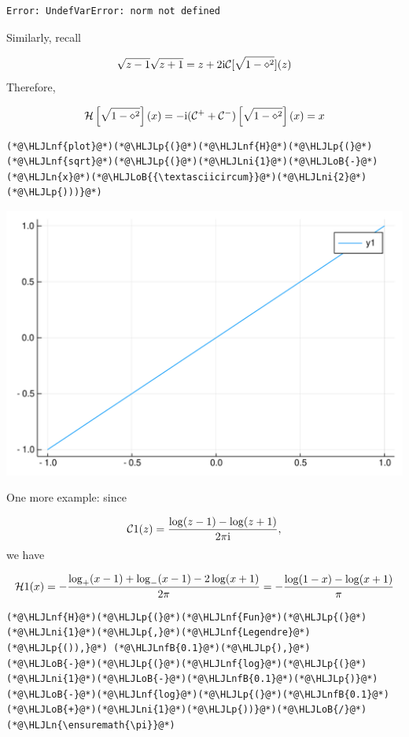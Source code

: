\documentclass[12pt,a4paper]{article}
\newcommand{\HLJLn}[1]{#1}
\newcommand{\HLJLnf}[1]{\textcolor[RGB]{66,102,213}{#1}}
\newcommand{\HLJLnfB}[1]{\textcolor[RGB]{59,151,46}{#1}}
\newcommand{\HLJLni}[1]{\textcolor[RGB]{59,151,46}{#1}}
\newcommand{\HLJLoB}[1]{\textcolor[RGB]{102,102,102}{\textbf{#1}}}
\newcommand{\HLJLp}[1]{#1}
\def\I{ {\rm i} }
\def\CC{ {\cal C} }
\def\HH{ {\cal H} }
\begin{document}
\begin{lstlisting}
Error: UndefVarError: norm not defined
\end{lstlisting}


Similarly, recall

\[
\sqrt{z-1}\sqrt{z+1} = z  + 2 \I {\cal C}[\sqrt{1-\diamond^2}](z)
\]
Therefore,

\[
{\cal H}\left[{\sqrt{1-\diamond^2}}\right](x) = -\I (\CC^+  + \CC^-) \left[{\sqrt{1-\diamond^2}}\right](x) = x 
\]

\begin{lstlisting}
(*@\HLJLnf{plot}@*)(*@\HLJLp{(}@*)(*@\HLJLnf{H}@*)(*@\HLJLp{(}@*)(*@\HLJLnf{sqrt}@*)(*@\HLJLp{(}@*)(*@\HLJLni{1}@*)(*@\HLJLoB{-}@*)(*@\HLJLn{x}@*)(*@\HLJLoB{{\textasciicircum}}@*)(*@\HLJLni{2}@*)(*@\HLJLp{)))}@*)
\end{lstlisting}

\includegraphics[width=\linewidth]{figures/Lecture14_7_1.pdf}

One more example: since

\[
\CC 1(z) = {\log(z-1) - \log(z+1) \over 2 \pi \I},
\]
we have 

\[
\HH 1(x) = -{\log_+(x-1) + \log_-(x-1) - 2\log(x+1) \over 2\pi} = -{\log(1-x) - \log(x+1) \over \pi}
\]

\begin{lstlisting}
(*@\HLJLnf{H}@*)(*@\HLJLp{(}@*)(*@\HLJLnf{Fun}@*)(*@\HLJLp{(}@*)(*@\HLJLni{1}@*)(*@\HLJLp{,}@*)(*@\HLJLnf{Legendre}@*)(*@\HLJLp{()),}@*) (*@\HLJLnfB{0.1}@*)(*@\HLJLp{),}@*) (*@\HLJLoB{-}@*)(*@\HLJLp{(}@*)(*@\HLJLnf{log}@*)(*@\HLJLp{(}@*)(*@\HLJLni{1}@*)(*@\HLJLoB{-}@*)(*@\HLJLnfB{0.1}@*)(*@\HLJLp{)}@*)(*@\HLJLoB{-}@*)(*@\HLJLnf{log}@*)(*@\HLJLp{(}@*)(*@\HLJLnfB{0.1}@*)(*@\HLJLoB{+}@*)(*@\HLJLni{1}@*)(*@\HLJLp{))}@*)(*@\HLJLoB{/}@*)(*@\HLJLn{\ensuremath{\pi}}@*)
\end{lstlisting}
\end{document}
